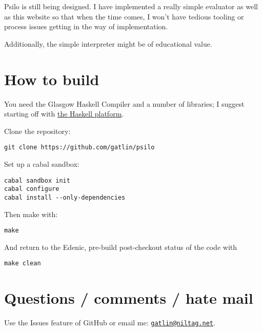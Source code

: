 \documentclass[]{article}
\begin{document}
Psilo is still being designed. I have implemented a really simple
evaluator as well as this website so that when the time comes, I won't
have tedious tooling or process issues getting in the way of
implementation.

Additionally, the simple interpreter might be of educational value.

\section{How to build}\label{how-to-build}

You need the Glasgow Haskell Compiler and a number of libraries; I
suggest starting off with \href{http://haskell.org/platform}{the Haskell
platform}.

Clone the repository:

\begin{verbatim}
git clone https://github.com/gatlin/psilo
\end{verbatim}

Set up a cabal sandbox:

\begin{verbatim}
cabal sandbox init
cabal configure
cabal install --only-dependencies
\end{verbatim}

Then make with:

\begin{verbatim}
make
\end{verbatim}

And return to the Edenic, pre-build post-checkout status of the code
with

\begin{verbatim}
make clean
\end{verbatim}

\section{Questions / comments / hate
mail}\label{questions-comments-hate-mail}

Use the Issues feature of GitHub or email me:
\href{mailto:gatlin@niltag.net}{\nolinkurl{gatlin@niltag.net}}.
\end{document}
